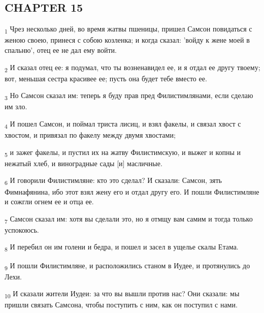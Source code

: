 \subsection{CHAPTER 15}
\begin{tcolorbox}
\textsubscript{1} Чрез несколько дней, во время жатвы пшеницы, пришел Самсон повидаться с женою своею, принеся с собою козленка; и когда сказал: 'войду к жене моей в спальню', отец ее не дал ему войти.
\end{tcolorbox}
\begin{tcolorbox}
\textsubscript{2} И сказал отец ее: я подумал, что ты возненавидел ее, и я отдал ее другу твоему; вот, меньшая сестра красивее ее; пусть она будет тебе вместо ее.
\end{tcolorbox}
\begin{tcolorbox}
\textsubscript{3} Но Самсон сказал им: теперь я буду прав пред Филистимлянами, если сделаю им зло.
\end{tcolorbox}
\begin{tcolorbox}
\textsubscript{4} И пошел Самсон, и поймал триста лисиц, и взял факелы, и связал хвост с хвостом, и привязал по факелу между двумя хвостами;
\end{tcolorbox}
\begin{tcolorbox}
\textsubscript{5} и зажег факелы, и пустил их на жатву Филистимскую, и выжег и копны и нежатый хлеб, и виноградные сады [и] масличные.
\end{tcolorbox}
\begin{tcolorbox}
\textsubscript{6} И говорили Филистимляне: кто это сделал? И сказали: Самсон, зять Фимнафянина, ибо этот взял жену его и отдал другу его. И пошли Филистимляне и сожгли огнем ее и отца ее.
\end{tcolorbox}
\begin{tcolorbox}
\textsubscript{7} Самсон сказал им: хотя вы сделали это, но я отмщу вам самим и тогда только успокоюсь.
\end{tcolorbox}
\begin{tcolorbox}
\textsubscript{8} И перебил он им голени и бедра, и пошел и засел в ущелье скалы Етама.
\end{tcolorbox}
\begin{tcolorbox}
\textsubscript{9} И пошли Филистимляне, и расположились станом в Иудее, и протянулись до Лехи.
\end{tcolorbox}
\begin{tcolorbox}
\textsubscript{10} И сказали жители Иудеи: за что вы вышли против нас? Они сказали: мы пришли связать Самсона, чтобы поступить с ним, как он поступил с нами.
\end{tcolorbox}
